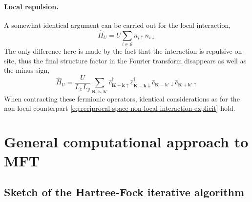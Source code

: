 \paragraph{Local repulsion.}\label{subsec:mft-discussion-reciprocal-local}

A somewhat identical argument can be carried out for the local interaction,
\[
	\hat H_U = U \sum_{i \in \mathcal{S}} \hat n_{i\uparrow} \hat n_{i\downarrow}
\]
The only difference here is made by the fact that the interaction is repulsive on-site, thus the final structure factor in the Fourier transform disappears as well as the minus sign,
\begin{equation} \label{eq:reciprocal-space-local-interaction-explicit}
	\hat H_U = \frac{U}{L_x L_y}
	\sum_{\mathbf{K}, \mathbf{k}, \mathbf{k}'} \hat c_{\mathbf{K}+\mathbf{k} \uparrow}^\dagger \hat c_{\mathbf{K}-\mathbf{k} \downarrow}^\dagger \hat c_{\mathbf{K}-\mathbf{k}' \downarrow} \hat c_{\mathbf{K}+\mathbf{k}' \uparrow}
\end{equation}
When contracting these fermionic operators, identical considerations as for the non-local counterpart \eqref{eq:reciprocal-space-non-local-interaction-explicit} hold.

\section{General computational approach to MFT}\label{sec:computational-mft}
\todo

\subsection{Sketch of the Hartree-Fock iterative algorithm}\label{subsec:hf-sketch}

